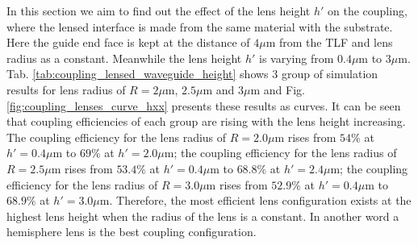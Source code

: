 In this section we aim to find out the effect of the lens height $h'$ on the coupling, where the lensed interface is made from the same material with the substrate. Here the guide end face is kept at the distance of $4\mu$m from the TLF and lens radius as a constant. Meanwhile the lens height $h'$ is varying from $0.4\mu$m to $3\mu$m. \\

Tab. \ref{tab:coupling_lensed_waveguide_height} shows 3 group of simulation results for lens radius of $R=2\mu$m, $2.5\mu$m and $3\mu$m and Fig. \ref{fig:coupling_lenses_curve_hxx} presents these results as curves. It can be seen that coupling efficiencies of each group are rising with the lens height increasing.  The coupling efficiency for the lens radius of $R=2.0\mu$m rises from $54\%$ at $h'=0.4\mu$m to $69\%$ at $h'=2.0\mu$m; the coupling efficiency for the lens radius of $R=2.5\mu$m rises from $53.4\%$ at $h'=0.4\mu$m to $68.8\%$ at $h'=2.4\mu$m; the coupling efficiency for the lens radius of $R=3.0\mu$m rises from $52.9\%$ at $h'=0.4\mu$m to $68.9\%$ at $h'=3.0\mu$m. Therefore, the most efficient lens configuration exists at the highest lens height when the radius of the lens is a constant. In another word a hemisphere lens is the best coupling configuration. \\

